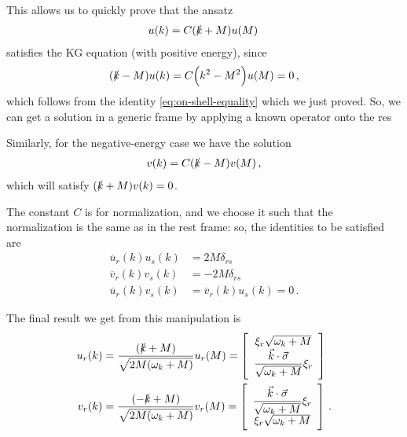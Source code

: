 \documentclass[main.tex]{subfiles}
\begin{document}
This allows us to quickly prove that the ansatz 
%
\begin{align}
u(k) = C (\slashed{k} + M) u(M)
\,
\end{align}
%
satisfies the KG equation (with positive energy), since 
%
\begin{align}
(\slashed{k} - M) u(k) = C \qty(k^2 - M^2) u(M) = 0
\,,
\end{align}
%
which follows from the identity \eqref{eq:on-shell-equality} which we just proved.
So, we can get a solution in a generic frame by applying a known operator onto the res


Similarly, for the negative-energy case we have the solution 
%
\begin{align}
v(k) = C (\slashed{k} - M )v(M)
\,,
\end{align}
%
which will satisfy \((\slashed{k} + M) v(k) = 0\).

The constant \(C\) is for normalization, and we choose it such that the normalization is the same as in the rest frame: so, the identities to be satisfied are 
%
\begin{subequations}
\begin{align} \label{eq:normalization-spinor}
\overline{u}_{r} (k) u_{s}(k) &= 2 M \delta_{rs}  \\
\overline{v}_{r} (k) v_{s}(k) &= - 2 M \delta_{rs}  \\
\overline{u}_{r} (k) v_{s}(k) &=   
\overline{v}_{r} (k) u_{s}(k) = 0  
\,.
\end{align}
\end{subequations}

\begin{claim}
The final result we get from this manipulation is 
%
\begin{subequations} \label{eq:dirac-equation-solutions}
\begin{align}
u_r (k) &= \frac{(\slashed{k} + M)}{\sqrt{2 M \qty(\omega_{k} + M )}} u_r (M)
= \left[\begin{array}{c}
\xi_{r}\sqrt{\omega_{k} + M} \\ 
\displaystyle
\frac{\vec{k} \cdot \vec{\sigma}}{\sqrt{\omega_{k} + M}} 
\xi_{r}
\end{array}\right] \label{eq:positive-energy-dirac-solution-momentum-space}\\
v_r (k) &= \frac{(-\slashed{k} + M)}{\sqrt{2 M \qty(\omega_{k} + M )}} v_r (M)
= \left[\begin{array}{c}
\displaystyle
\frac{\vec{k} \cdot \vec{\sigma}}{\sqrt{\omega_{k} + M}} \xi_{r}\\
\xi_{r}\sqrt{\omega_{k} + M} 
\end{array}\right]
\,.
\end{align}
\end{subequations}
\end{claim}
\end{document}
